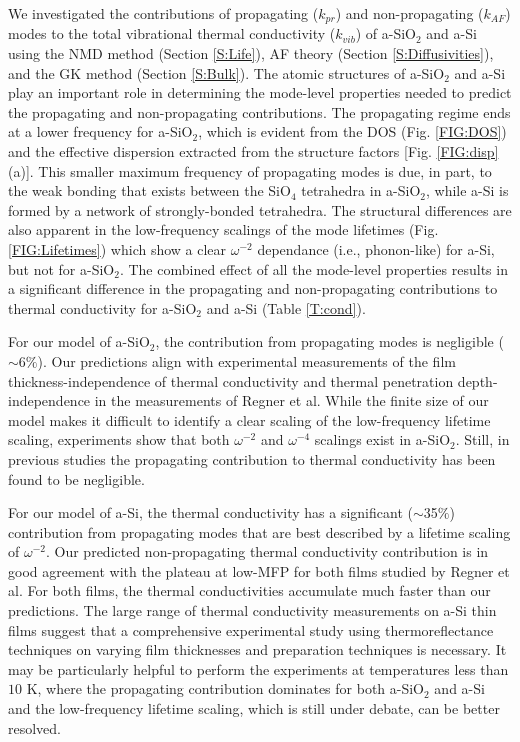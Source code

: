 \documentclass[aps,prb,twocolumn,superscriptaddress,footinbib,amsmath,amssymb,floatfix]{revtex4}
\begin{document}
We investigated the contributions of propagating ($k_{pr}$) 
and non-propagating ($k_{AF}$) modes to the total vibrational 
thermal conductivity ($k_{vib}$) of 
a-SiO$_2$ and a-Si using the NMD method (Section \ref{S:Life}),  
AF theory (Section \ref{S:Diffusivities}), and 
the GK method (Section \ref{S:Bulk}). 
The atomic structures of a-SiO$_2$ and a-Si play an important role 
in determining the mode-level properties needed to predict the 
propagating and non-propagating contributions. The 
propagating regime ends at a lower frequency for a-SiO$_2$, which is 
evident from the DOS (Fig. \ref{FIG:DOS}) 
and the effective dispersion extracted from the structure factors 
[Fig. \ref{FIG:disp}(a)]. This smaller maximum frequency of 
propagating modes is due, in part, 
to the weak bonding that exists between the SiO$_4$ 
tetrahedra in a-SiO$_2$, 
while a-Si is formed by a network 
of strongly-bonded tetrahedra. 
The structural differences are also 
apparent in the low-frequency scalings of the mode lifetimes (Fig. 
\ref{FIG:Lifetimes}) which show a clear $\omega^{-2}$ dependance 
(i.e., phonon-like) 
for a-Si, but not for a-SiO$_2$. The combined effect of all the 
mode-level properties results in a significant difference 
in the propagating and non-propagating contributions 
to thermal conductivity for a-SiO$_2$ and a-Si (Table \ref{T:cond}). 

For our model of a-SiO$_2$, the contribution from propagating modes 
is negligible ($\sim$6$\%$). 
Our predictions align with experimental measurements of the film 
thickness-independence of thermal conductivity 
\cite{lee_heat_1997,yamane_measurement_2002} 
and thermal penetration depth-independence in the measurements  
of Regner et al.\cite{regner_broadband_2013}
While the finite size 
of our model makes it difficult to identify a clear scaling 
of the low-frequency lifetime scaling, experiments show that 
both $\omega^{-2}$ and $\omega^{-4}$ scalings exist in 
a-SiO$_2$.\cite{masciovecchio_evidence_2006,baldi_sound_2010,
baldi_emergence_2013} Still, in previous studies the propagating 
contribution to thermal conductivity has been found to be 
negligible.\cite{love_estimate_1990,lee_heat_1997,
yamane_measurement_2002}

For our model of a-Si, 
the thermal conductivity has a significant ($\sim$35$\%$) 
contribution from propagating modes that are best 
described by a lifetime scaling of $\omega^{-2}$. Our predicted 
non-propagating thermal conductivity contribution is in good 
agreement with the plateau at low-MFP for both films studied by 
Regner et al. For both films, the thermal conductivities accumulate 
much faster than our predictions. The large range of thermal 
conductivity measurements on a-Si thin films suggest that a 
comprehensive experimental study using thermoreflectance 
techniques on varying film thicknesses and preparation 
techniques is necessary.  
It may be particularly helpful to perform the experiments 
at temperatures less than $10$ K, where the propagating contribution 
dominates for both a-SiO$_2$ and a-Si and the low-frequency 
lifetime scaling, which is still under debate, can be better resolved. 
\end{document}
